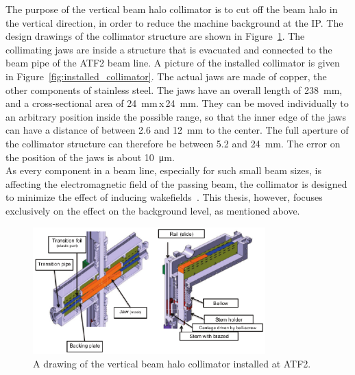 The purpose of the vertical beam halo collimator is to cut off the beam halo in the vertical direction, in order to reduce the machine background at the IP.
The design drawings of the collimator structure are shown in Figure~\ref{fig:collimator}.
The collimating jaws are inside a structure that is evacuated and connected to the beam pipe of the ATF2 beam line. 
A picture of the installed collimator is given in Figure~\ref{fig:installed_collimator}.
The actual jaws are made of copper, the other components of stainless steel. 
The jaws have an overall length of \SI{238}{\milli\meter}, and a cross-sectional area of \mbox{\SI{24}{\milli\meter}\,x\,\SI{24}{\milli\meter}}.
They can be moved individually to an arbitrary position inside the possible range, so that the inner edge of the jaws can have a distance of between 2.6 and \SI{12}{\milli\metre} to the center. 
The full aperture of the collimator structure can therefore be between 5.2 and \SI{24}{\milli\metre}. 
The error on the position of the jaws is about \SI{10}{\micro\metre}.\\
As every component in a beam line, especially for such small beam sizes, is affecting the electromagnetic field of the passing beam, the collimator is designed to minimize the effect of inducing wakefields~\cite{NuriaCollimator2015,Nuria_Thesis}. 
This thesis, however, focuses exclusively on the effect on the background level, as mentioned above.
\begin{figure}
\centering
\includegraphics[width=0.8\textwidth]{Figures/ATF/ATF2_beamhalo_collimator.pdf}
\caption[Drawing of the beam halo collimator]{A drawing of the vertical beam halo collimator installed at ATF2.~\cite{NuriaCollimator2015}}
\label{fig:collimator}
\end{figure}
